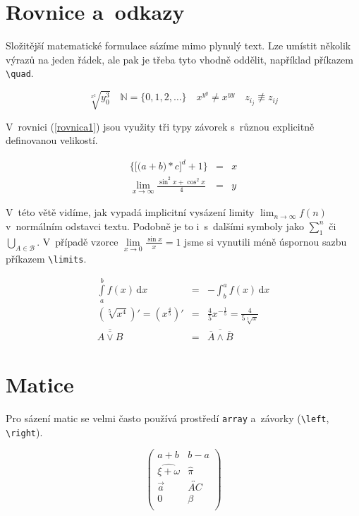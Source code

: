 \documentclass[a4paper, twocolumn, 11pt]{article}
\theoremstyle{definition}
\theoremstyle{plain}
\theoremstyle{plain}
\begin{document}
	\section{Rovnice a~odkazy}
	Složitější matematické formulace sázíme mimo plynulý text. Lze umístit několik výrazů na jeden řádek, ale pak je třeba tyto vhodně oddělit, například příkazem \verb|\quad|.

	$$ \sqrt[x^2]{y^3_0} \quad \mathbb{N}=\{\mathrm{0,1,2,\dots}\} \quad x^{y^y} \not= x^{yy} \quad z_{i_{j}} \not\equiv z_{ij}$$
	
	V~rovnici (\ref{rovnica1}) jsou využity tři typy závorek s~různou explicitně definovanou velikostí.

	\begin{eqnarray}
		\bigg\{\Big[\big(a + b\big) * c\Big]^d + 1 \bigg\} & = & x\label{rovnica1} \\
		\lim_{x \to \infty} \frac{\sin^2 x + \cos^2 x}{4} & = & y \nonumber
	\end{eqnarray}

	V~této větě vidíme, jak vypadá implicitní vysázení limity $\lim_{n \to \infty} f(n)$ v~normálním odstavci textu. Podobně je to i~s~dalšími symboly jako $\sum_1^n$ či $\bigcup_{A\in \mathcal{B}}$. V~případě vzorce $\lim\limits_{x \to 0}\frac{\sin x}{x}=1$ jsme si vynutili méně úspornou sazbu příkazem \verb|\limits|.

	\begin{eqnarray}
	 \int\limits_a^b f(x)\,\mathrm{d}x &=& -\int_b^a f(x)\,\mathrm{d}x  \\
	\left(\sqrt[5]{x^4}\right)' = \left(x^{\frac{4}{5}}\right)' &=& \frac{4}{5}x^{-\frac{1}{5}} = \frac{4}{5\sqrt[5]{x}}\\
	\overline{\overline{A \vee B}} &=& \overline{\overline{A} \wedge \overline{B}}
	\end{eqnarray}

	\section{Matice}
	Pro sázení matic se velmi často používá prostředí \texttt{array} a~závorky (\verb|\left|, \verb|\right|).

	$$\left( \begin{array}{cc}
	a + b & b - a \\
	\widehat{\xi + \omega} & \hat{\pi} \\
	\vec{a} & \overleftrightarrow{AC} \\
	0 & \beta\\
	\end{array} \right)$$
\end{document}

